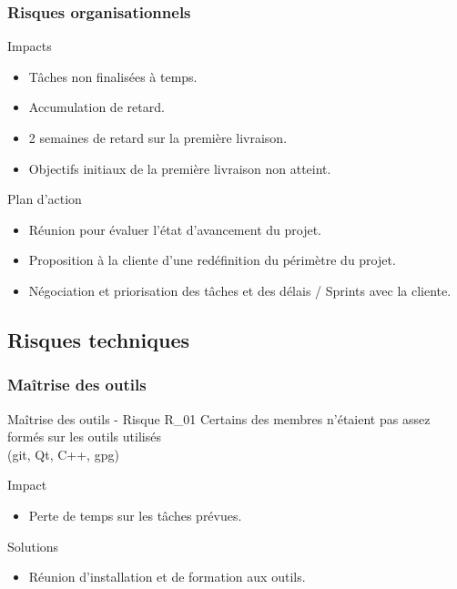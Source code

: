     \begin{frame}
      \frametitle{\color{white}Risques organisationnels}
      \begin{alertblock}{Impacts}
      	\begin{itemize}
      	 \item Tâches non finalisées à temps.
      	 \item Accumulation de retard.
      	 \item 2 semaines de retard sur la première livraison.
      	 \item Objectifs initiaux de la première livraison non atteint.
      	\end{itemize}
      \end{alertblock}
      \pause
      \begin{exampleblock}{Plan d'action}
        \begin{itemize}
          \item Réunion pour évaluer l'état d'avancement du projet.
          \item Proposition à la cliente d'une redéfinition du périmètre du projet.
          \item Négociation et priorisation des tâches et des délais / Sprints avec la cliente.
        \end{itemize}
      \end{exampleblock}
    \end{frame}

  \subsection{Risques techniques}
    \begin{frame}
      \frametitle{\color{white}Maîtrise des outils}
      \begin{block}{Maîtrise des outils - Risque R\_01}
        Certains des membres n'étaient pas assez formés sur les outils utilisés\\
        (git, Qt, C++, gpg)
      \end{block}
      \pause
      \begin{alertblock}{Impact}
        \begin{itemize}
          \item Perte de temps sur les tâches prévues.
        \end{itemize}
      \end{alertblock}
      \pause
      \begin{exampleblock}{Solutions}
        \begin{itemize}
          \item Réunion d'installation et de formation aux outils. 
        \end{itemize}
      \end{exampleblock}
    \end{frame}


